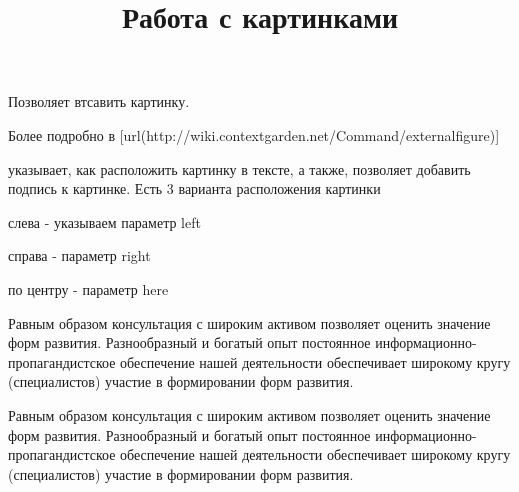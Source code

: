 \title{Работа с картинками}

\subject{}

Позволяет втсавить картинку.

 \hfill
\startTEX
{}
\stopTEX
\stopdescr

 \hfill
\startCODERESULT
{}
\stopCODERESULT
\stopdescr

\startTEX
{}
\stopTEX


Более подробно в
[url(http://wiki.contextgarden.net/Command/externalfigure)]

\subject{}

 указывает, как расположить картинку в тексте, а также,
позволяет добавить подпись к картинке. Есть 3 варианта расположения картинки

\startitemize
\item слева - указываем параметр left
\item справа - параметр right
\item по центру - параметр here
\stopitemize

 \hfill
\startTEX
{}

Равным образом консультация с широким активом
позволяет оценить значение форм
развития. Разнообразный и богатый опыт постоянное
информационно-пропагандистское обеспечение нашей
деятельности обеспечивает широкому кругу
(специалистов) участие в формировании форм
развития.
\stopTEX
\stopdescr

 \hfill
{}

Равным образом консультация с широким активом
позволяет оценить значение форм
развития. Разнообразный и богатый опыт постоянное
информационно-пропагандистское обеспечение нашей
деятельности обеспечивает широкому кругу
(специалистов) участие в формировании форм
развития.
\stopdescr

